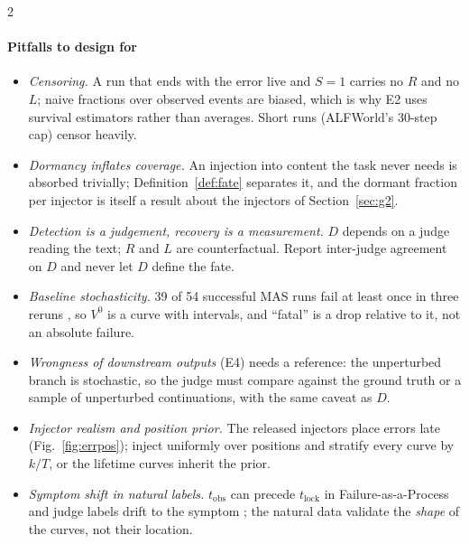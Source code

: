 \begin{multicols}{2}
\paragraph{Pitfalls to design for}
\begin{itemize}[leftmargin=1.1em]
\item \emph{Censoring.} A run that ends with the error live and $S{=}1$ carries no $R$ and no $L$; naive fractions over observed events are biased, which is why E2 uses survival estimators rather than averages. Short runs (ALFWorld's 30-step cap) censor heavily.
\item \emph{Dormancy inflates coverage.} An injection into content the task never needs is absorbed trivially; Definition~\ref{def:fate} separates it, and the dormant fraction per injector is itself a result about the injectors of Section~\ref{sec:g2}.
\item \emph{Detection is a judgement, recovery is a measurement.} $D$ depends on a judge reading the text; $R$ and $L$ are counterfactual. Report inter-judge agreement on $D$ and never let $D$ define the fate.
\item \emph{Baseline stochasticity.} 39 of 54 successful MAS runs fail at least once in three reruns \cite{luan2026symtrace}, so $V^0$ is a curve with intervals, and ``fatal'' is a drop relative to it, not an absolute failure.
\item \emph{Wrongness of downstream outputs} (E4) needs a reference: the unperturbed branch is stochastic, so the judge must compare against the ground truth or a sample of unperturbed continuations, with the same caveat as $D$.
\item \emph{Injector realism and position prior.} The released injectors place errors late (Fig.~\ref{fig:errpos}); inject uniformly over positions and stratify every curve by $k/T$, or the lifetime curves inherit the prior.
\item \emph{Symptom shift in natural labels.} $t_{\mathrm{obs}}$ can precede $t_{\mathrm{lock}}$ in Failure-as-a-Process and judge labels drift to the symptom \cite{shen2026epv}; the natural data validate the \emph{shape} of the curves, not their location.
\end{itemize}


\end{multicols}
